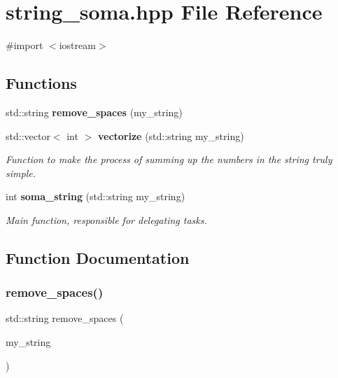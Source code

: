 \section{string\+\_\+soma.\+hpp File Reference}
\label{string__soma_8hpp}
{\ttfamily \#import $<$iostream$>$}\newline
\subsection*{Functions}
\begin{DoxyCompactItemize}
\item 
std\+::string \textbf{ remove\+\_\+spaces} (my\+\_\+string)
\item 
std\+::vector$<$ int $>$ \textbf{ vectorize} (std\+::string my\+\_\+string)
\begin{DoxyCompactList}\small\item\em Function to make the process of summing up the numbers in the string truly simple. \end{DoxyCompactList}\item 
int \textbf{ soma\+\_\+string} (std\+::string my\+\_\+string)
\begin{DoxyCompactList}\small\item\em Main function, responsible for delegating tasks. \end{DoxyCompactList}\end{DoxyCompactItemize}


\subsection{Function Documentation}
\mbox{\label{string__soma_8hpp_a9148655a46cc1e3919ceba60410c17f0}} 
\subsubsection{remove\+\_\+spaces()}
{\footnotesize\ttfamily std\+::string remove\+\_\+spaces (\begin{DoxyParamCaption}\item[{my\+\_\+string}]{ }\end{DoxyParamCaption})}

\mbox{\label{string__soma_8hpp_a781699877e3eb1ffda778737f2467621}} 
